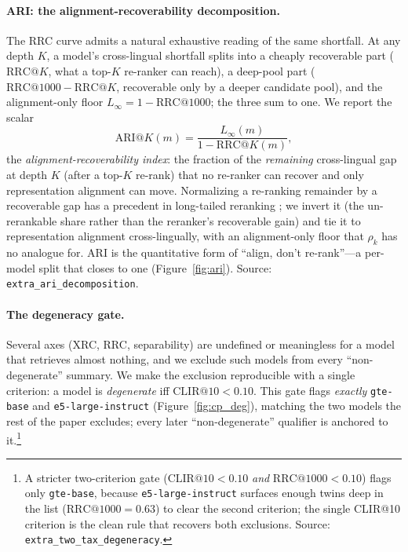 \documentclass[11pt]{article}
\begin{document}
\paragraph{ARI: the alignment-recoverability decomposition.}
The RRC curve admits a natural exhaustive reading of the same shortfall. At any
depth $K$, a model's cross-lingual shortfall splits into a cheaply recoverable
part ($\mathrm{RRC@}K$, what a top-$K$ re-ranker can reach), a deep-pool part
($\mathrm{RRC@}1000-\mathrm{RRC@}K$, recoverable only by a deeper candidate
pool), and the alignment-only floor $L_\infty=1-\mathrm{RRC@}1000$; the three sum
to one. We report the scalar
\begin{equation}
\label{eq:ari}
\mathrm{ARI@}K(m) = \frac{L_\infty(m)}{1-\mathrm{RRC@}K(m)},
\end{equation}
the \emph{alignment-recoverability index}: the fraction of the \emph{remaining}
cross-lingual gap at depth $K$ (after a top-$K$ re-rank) that no re-ranker can
recover and only representation alignment can move. Normalizing a re-ranking
remainder by a recoverable gap has a precedent in long-tailed reranking
\citep{residualrerank2026}; we invert it (the un-rerankable share rather than the
reranker's recoverable gain) and tie it to representation alignment
cross-lingually, with an alignment-only floor that $\rho_k$ has no analogue for.
ARI is the quantitative form of ``align, don't re-rank''---a per-model split that
closes to one (Figure~\ref{fig:ari}). Source: \texttt{extra\_ari\_decomposition}.

\paragraph{The degeneracy gate.}
Several axes (XRC, RRC, separability) are undefined or meaningless for a model
that retrieves almost nothing, and we exclude such models from every
``non-degenerate'' summary. We make the exclusion reproducible with a single
criterion: a model is \emph{degenerate} iff $\mathrm{CLIR@10} < 0.10$. This gate
flags \emph{exactly} \texttt{gte-base} and \texttt{e5-large-instruct}
(Figure~\ref{fig:cp_deg}), matching the two models the rest of the paper
excludes; every later ``non-degenerate'' qualifier is anchored to it.\footnote{A
stricter two-criterion gate ($\mathrm{CLIR@10}<0.10$ \emph{and}
$\mathrm{RRC@}1000<0.10$) flags only \texttt{gte-base}, because
\texttt{e5-large-instruct} surfaces enough twins deep in the list
($\mathrm{RRC@}1000=0.63$) to clear the second criterion; the single CLIR@10
criterion is the clean rule that recovers both exclusions. Source:
\texttt{extra\_two\_tax\_degeneracy}.}
\end{document}
